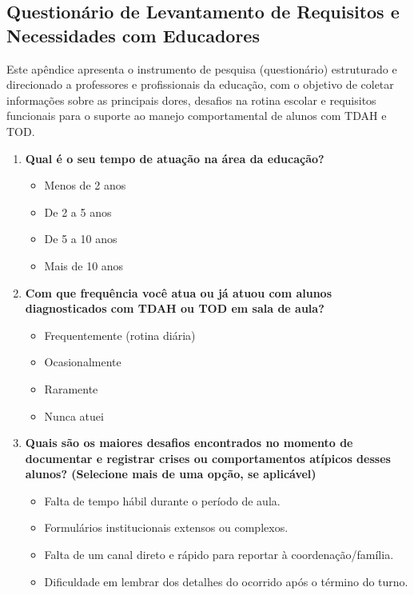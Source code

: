 \documentclass[%
    	        oneside,                   %
]{configuracoes/norma-abntex2}
\begin{document}
    \postextual
\begin{apendicesenv}
\partapendices %

\chapter{Questionário de Levantamento de Requisitos e Necessidades com Educadores}
\label{apendice:questionario}
Este apêndice apresenta o instrumento de pesquisa (questionário) estruturado e direcionado a professores e profissionais da educação, com o objetivo de coletar informações sobre as principais dores, desafios na rotina escolar e requisitos funcionais para o suporte ao manejo comportamental de alunos com TDAH e TOD.

\begin{enumerate}
    \item \textbf{Qual é o seu tempo de atuação na área da educação?}
    \begin{itemize}
        \item[ ] Menos de 2 anos
        \item[ ] De 2 a 5 anos
        \item[ ] De 5 a 10 anos
        \item[ ] Mais de 10 anos
    \end{itemize}
    
    \item \textbf{Com que frequência você atua ou já atuou com alunos diagnosticados com TDAH ou TOD em sala de aula?}
    \begin{itemize}
        \item[ ] Frequentemente (rotina diária)
        \item[ ] Ocasionalmente
        \item[ ] Raramente
        \item[ ] Nunca atuei
    \end{itemize}

    \item \textbf{Quais são os maiores desafios encontrados no momento de documentar e registrar crises ou comportamentos atípicos desses alunos? (Selecione mais de uma opção, se aplicável)}
    \begin{itemize}
        \item[ ] Falta de tempo hábil durante o período de aula.
        \item[ ] Formulários institucionais extensos ou complexos.
        \item[ ] Falta de um canal direto e rápido para reportar à coordenação/família.
        \item[ ] Dificuldade em lembrar dos detalhes do ocorrido após o término do turno.
    \end{itemize}


\end{enumerate}
\end{apendicesenv}
\end{document}
